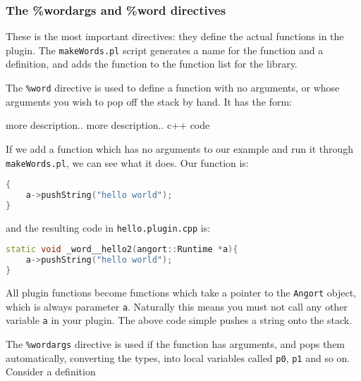 \subsubsection{The \%wordargs and \%word directives}
These is the most important directives: they define the actual functions
in the plugin. The \texttt{makeWords.pl} script generates a name
for the function and a definition, and adds the function to the
function list for the library.

The \texttt{\%word} directive is used to define a function with no
arguments, or whose arguments you wish to pop off the stack by hand.
It has the form:
\begin{v}
more description..
more description..
{
    c++ code
}
\end{v}

If we add a function which has no arguments to our example
and run it through \texttt{makeWords.pl}, we can see what it does.
Our function is:
\begin{lstlisting}[language=c++]
%word hello2 (-- string) a test
{
    a->pushString("hello world");
}
\end{lstlisting}
and the resulting code in \texttt{hello.plugin.cpp} is:
\begin{lstlisting}[language=c++]
static void _word__hello2(angort::Runtime *a){
    a->pushString("hello world");
}
\end{lstlisting}
All plugin functions become functions which take a pointer to the
\texttt{Angort} object, which is always parameter \texttt{a}. Naturally
this means you must not call any other variable \texttt{a} in your
plugin. The above code simple pushes a string onto the stack.

The \texttt{\%wordargs} directive is used if the function has arguments,
and pops them automatically, converting the types, into local variables
called \texttt{p0}, \texttt{p1} and so on. Consider a definition

